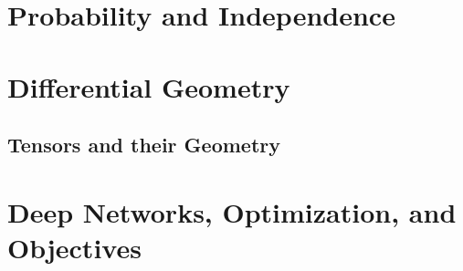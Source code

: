 \section{Probability and Independence}


\section{Differential Geometry}\label{sec:diffgeom}


\subsection{Tensors and their Geometry}


\section{Deep Networks, Optimization, and Objectives}

